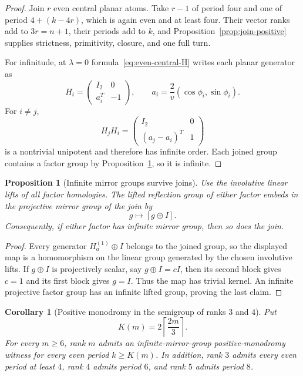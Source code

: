\documentclass[11pt,a4paper]{article}
\theoremstyle{plain}
\newtheorem{proposition}[theorem]{Proposition}
\newtheorem{corollary}[theorem]{Corollary}
\theoremstyle{definition}
\theoremstyle{remark}
\begin{document}
\begin{proof}
Join $r$ even central planar atoms.  Take $r-1$ of period four and one of period
$4+(k-4r)$, which is again even and at least four.  Their vector ranks add to
$3r=n+1$, their periods add to $k$, and Proposition~\ref{prop:join-positive}
supplies strictness, primitivity, closure, and one full turn.

For infinitude, at $\lambda=0$ formula~\eqref{eq:even-central-H} writes each
planar generator as
\[
 H_i=\begin{pmatrix}I_2&0\\ a_i^T&-1\end{pmatrix},
 \qquad a_i=\frac2v(\cos\phi_i,\sin\phi_i).
\]
For $i\ne j$,
\[
 H_jH_i=\begin{pmatrix}I_2&0\\ (a_j-a_i)^T&1\end{pmatrix}
\]
is a nontrivial unipotent and therefore has infinite order.  Each joined group
contains a factor group by Proposition~\ref{prop:join-infinite}, so it is infinite.
\end{proof}

\begin{proposition}[Infinite mirror groups survive joins]\label{prop:join-infinite}
Use the involutive linear lifts of all factor homologies.  The lifted reflection
group of either factor embeds in the projective mirror group of the join by
\[
              g\longmapsto [g\oplus I].
\]
Consequently, if either factor has infinite mirror group, then so does the join.
\end{proposition}

\begin{proof}
Every generator $H^{(1)}_a\oplus I$ belongs to the joined group, so the displayed
map is a homomorphism on the linear group generated by the chosen involutive lifts.
If $g\oplus I$ is projectively scalar, say $g\oplus I=cI$, then its second block
gives $c=1$ and its first block gives $g=I$.  Thus the map has trivial kernel.
An infinite projective factor group has an infinite lifted group, proving the last
claim.
\end{proof}

\begin{corollary}[Positive monodromy in the semigroup of ranks $3$ and $4$]
\label{cor:positive-rank-semigroup}
Put
\[
                    K(m)=2\left\lceil\frac{2m}{3}\right\rceil .
\]
For every $m\ge6$, rank $m$ admits an infinite-mirror-group positive-monodromy
witness for every even period $k\ge K(m)$.  In addition, rank $3$ admits every
even period at least $4$, rank $4$ admits period $6$, and rank $5$ admits period
$8$.
\end{corollary}
\end{document}
